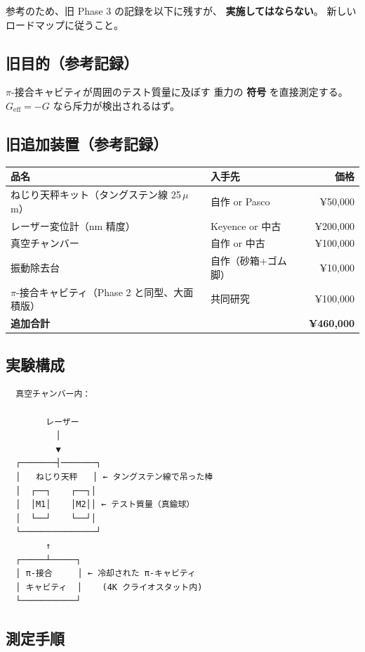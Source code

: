 \documentclass[11pt,a4paper]{article}
\begin{document}
参考のため、旧 Phase 3 の記録を以下に残すが、
\textbf{実施してはならない}。
新しいロードマップに従うこと。

\subsection{旧目的（参考記録）}

$\pi$-接合キャビティが周囲のテスト質量に及ぼす
重力の \textbf{符号} を直接測定する。
$G_{\mathrm{eff}} = -G$ なら斥力が検出されるはず。

\subsection{旧追加装置（参考記録）}

\begin{tcolorbox}[colback=blue!5,colframe=blue!50!black,title=Phase 3 追加部品（廃止）]
\begin{tabular}{llr}
\toprule
品名 & 入手先 & 価格 \\
\midrule
ねじり天秤キット（タングステン線 25\,$\mu$m） & 自作 or Pasco & ¥50,000 \\
レーザー変位計（nm 精度） & Keyence or 中古 & ¥200,000 \\
真空チャンバー & 自作 or 中古 & ¥100,000 \\
振動除去台 & 自作（砂箱+ゴム脚） & ¥10,000 \\
$\pi$-接合キャビティ（Phase 2 と同型、大面積版） & 共同研究 & ¥100,000 \\
\midrule
\textbf{追加合計} & & \textbf{¥460,000} \\
\bottomrule
\end{tabular}
\end{tcolorbox}

\subsection{実験構成}

\begin{verbatim}
  真空チャンバー内：

        レーザー
          │
          ▼
  ┌───────┤───────┐
  │   ねじり天秤   │ ← タングステン線で吊った棒
  │  ┌──┐    ┌──┐│
  │  │M1│    │M2││ ← テスト質量（真鍮球）
  │  └──┘    └──┘│
  └───────────────┘
        ↑
  ┌─────┴─────┐
  │ π-接合     │ ← 冷却された π-キャビティ
  │ キャビティ  │    (4K クライオスタット内)
  └───────────┘
\end{verbatim}

\subsection{測定手順}
\end{document}
